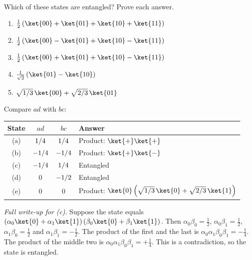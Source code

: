 \begin{exercisebox}
\begin{pproblem}\label{pp:five}
    Which of these states are entangled? Prove each answer.
    \begin{enumerate}[label=(\alph*)]
        \item $\frac{1}{2}\left(\ket{00} + \ket{01} + \ket{10} + \ket{11}\right)$
        \item $\frac{1}{2}\left(\ket{00} - \ket{01} + \ket{10} - \ket{11}\right)$
        \item $\frac{1}{2}\left(\ket{00} + \ket{01} + \ket{10} - \ket{11}\right)$
        \item $\frac{1}{\sqrt{2}}\left(\ket{01} - \ket{10}\right)$
        \item $\sqrt{\sfrac{1}{3}}\, \ket{00} + \sqrt{\sfrac{2}{3}}\, \ket{01}$
    \end{enumerate}
\end{pproblem}
\tcblower
\begin{wsolution}
    Compare $ad$ with $bc$:
    \begin{center}
        \begin{tabular}{cccl}
            \toprule
            State & $ad$              & $bc$              & Answer                                                                      \\ \midrule
            (a)   & $1/4$    & $1/4$    & Product: $\ket{+}\ket{+}$                                                   \\
            (b)   & $-1/4$   & $-1/4$   & Product: $\ket{+}\ket{-}$                                                   \\
            (c)   & $-1/4$   & $1/4$    & Entangled                                                                   \\
            (d)   & $0$               & $-1/2$   & Entangled                                                                   \\
            (e)   & $0$               & $0$               & Product: $\ket{0}\left(\sqrt{\sfrac{1}{3}}\,\ket{0} + \sqrt{\sfrac{2}{3}}\,\ket{1}\right)$ \\ \bottomrule
        \end{tabular}
    \end{center}

    \emph{Full write-up for (c).} Suppose the state equals
    $\left(\alpha_0\ket{0} + \alpha_1\ket{1}\right)\left(\beta_0\ket{0} + \beta_1\ket{1}\right)$.
    Then $\alpha_0\beta_0 = \frac{1}{2}$, $\alpha_0\beta_1 = \frac{1}{2}$,
    $\alpha_1\beta_0 = \frac{1}{2}$ and $\alpha_1\beta_1 = -\frac{1}{2}$. The product of the first
    and the last is $\alpha_0\alpha_1\beta_0\beta_1 = -\frac{1}{4}$. The product of the middle two
    is $\alpha_0\alpha_1\beta_0\beta_1 = +\frac{1}{4}$. This is a contradiction, so the state is
    entangled.
\end{wsolution}
\end{exercisebox}

